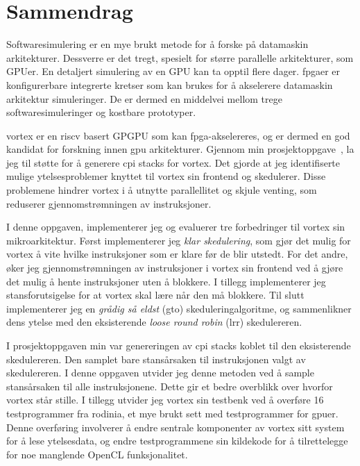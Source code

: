 \chapter*{Sammendrag}

Softwaresimulering er en mye brukt metode for å forske på datamaskin arkitekturer. Dessverre er det tregt, spesielt for større parallelle arkitekturer, som GPUer. En detaljert simulering av en GPU kan ta opptil flere dager. \acrshort{fpga}er er konfigurerbare integrerte kretser som kan brukes for å akselerere datamaskin arkitektur simuleringer. De er dermed en middelvei mellom trege softwaresimuleringer og kostbare prototyper.

\Gls{vortex} er en \Gls{riscv} basert GPGPU som kan \acrshort{fpga}-akselereres, og er dermed en god kandidat for forskning innen \acrshort{gpu} arkitekturer. Gjennom min prosjektoppgave~\cite{Aurud_Project}, la jeg til støtte for å generere \acrshort{cpi} stacks for \Gls{vortex}. Det gjorde at jeg identifiserte mulige ytelsesproblemer knyttet til \Gls{vortex} sin frontend og skedulerer. Disse problemene hindrer \Gls{vortex} i å utnytte parallellitet og skjule venting, som reduserer gjennomstrømningen av instruksjoner.

I denne oppgaven, implementerer jeg og evaluerer tre forbedringer til \Gls{vortex} sin mikroarkitektur. Først implementerer jeg \textit{klar skedulering}, som gjør det mulig for \Gls{vortex} å vite hvilke instruksjoner som er klare før de blir utstedt. For det andre, øker jeg gjennomstrømningen av instruksjoner i \Gls{vortex} sin frontend ved å gjøre det mulig å hente instruksjoner uten å blokkere. I tillegg implementerer jeg stansforutsigelse for at \Gls{vortex} skal lære når den må blokkere. Til slutt implementerer jeg en \textit{grådig så eldst} (\acrshort{gto}) skeduleringalgoritme, og sammenlikner dens ytelse med den eksisterende \textit{loose round robin} (\acrshort{lrr}) skedulereren.

I prosjektoppgaven min var genereringen av \acrshort{cpi} stacks koblet til den eksisterende skedulereren. Den samplet bare stansårsaken til instruksjonen valgt av skedulereren. I denne oppgaven utvider jeg denne metoden ved å sample stansårsaken til alle instruksjonene. Dette gir et bedre overblikk over hvorfor \Gls{vortex} står stille. I tillegg utvider jeg \Gls{vortex} sin testbenk ved å overføre 16 testprogrammer fra \Gls{rodinia}, et mye brukt sett med testprogrammer for \acrshort{gpu}er. Denne overføring involverer å endre sentrale komponenter av \Gls{vortex} sitt system for å lese ytelsesdata, og endre testprogrammene sin kildekode for å tilrettelegge for noe manglende OpenCL funksjonalitet.

